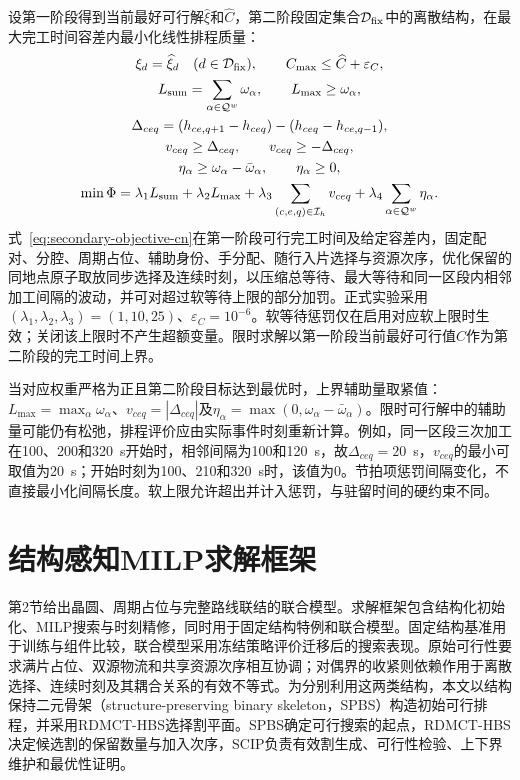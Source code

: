 \documentclass[final,5p,times,twocolumn]{elsarticle}
\newcommand{\method}{RDMCT-HBS}
\begin{document}
设第一阶段得到当前最好可行解$\widehat\xi$和$\widehat C$，第二阶段固定集合$\mathcal D_{\rm fix}$中的离散结构，在最大完工时间容差内最小化线性排程质量：
\begin{equation}
\begin{gathered}
\xi_d=\widehat\xi_d\quad(d\in\mathcal D_{\rm fix}),\qquad
C_{\max}\le\widehat C+\varepsilon_C,\\
L_{\rm sum}=\sum_{\alpha\in\mathcal Q^w}\omega_\alpha,\qquad
L_{\max}\ge\omega_\alpha,\\
\Delta_{ceq}=(h_{ce,q+1}-h_{ceq})-(h_{ceq}-h_{ce,q-1}),\\
v_{ceq}\ge\Delta_{ceq},\qquad v_{ceq}\ge-\Delta_{ceq},\\
\eta_\alpha\ge\omega_\alpha-\bar\omega_\alpha,\qquad
\eta_\alpha\ge0,\\
\min\Phi=\lambda_1L_{\rm sum}+\lambda_2L_{\max}
+\lambda_3\sum_{(c,e,q)\in\mathcal I_h}v_{ceq}
+\lambda_4\sum_{\alpha\in\mathcal Q^w}\eta_\alpha.
\end{gathered}
\label{eq:secondary-objective-cn}
\end{equation}
式~\eqref{eq:secondary-objective-cn}在第一阶段可行完工时间及给定容差内，固定配对、分腔、周期占位、辅助身份、手分配、随行入片选择与资源次序，优化保留的同地点原子取放同步选择及连续时刻，以压缩总等待、最大等待和同一区段内相邻加工间隔的波动，并可对超过软等待上限的部分加罚。正式实验采用$(\lambda_1,\lambda_2,\lambda_3)=(1,10,25)$、$\varepsilon_C=10^{-6}$。软等待惩罚仅在启用对应软上限时生效；关闭该上限时不产生超额变量。限时求解以第一阶段当前最好可行值$\widehat C$作为第二阶段的完工时间上界。

当对应权重严格为正且第二阶段目标达到最优时，上界辅助量取紧值：$L_{\max}=\max_\alpha\omega_\alpha$、$v_{ceq}=|\Delta_{ceq}|$及$\eta_\alpha=\max(0,\omega_\alpha-\bar\omega_\alpha)$。限时可行解中的辅助量可能仍有松弛，排程评价应由实际事件时刻重新计算。例如，同一区段三次加工在100、200和320~s开始时，相邻间隔为100和120~s，故$\Delta_{ceq}=20$~s，$v_{ceq}$的最小可取值为20~s；开始时刻为100、210和320~s时，该值为0。节拍项惩罚间隔变化，不直接最小化间隔长度。软上限允许超出并计入惩罚，与驻留时间的硬约束不同。

\section{结构感知MILP求解框架}

第2节给出晶圆、周期占位与完整路线联结的联合模型。求解框架包含结构化初始化、MILP搜索与时刻精修，同时用于固定结构特例和联合模型。固定结构基准用于训练与组件比较，联合模型采用冻结策略评价迁移后的搜索表现。原始可行性要求满片占位、双源物流和共享资源次序相互协调；对偶界的收紧则依赖作用于离散选择、连续时刻及其耦合关系的有效不等式。为分别利用这两类结构，本文以结构保持二元骨架（structure-preserving binary skeleton，SPBS）构造初始可行排程，并采用\method{}选择割平面。SPBS确定可行搜索的起点，\method{}决定候选割的保留数量与加入次序，SCIP负责有效割生成、可行性检验、上下界维护和最优性证明\citep{achterberg2009scip,bestuzheva2023scip}。
\end{document}
